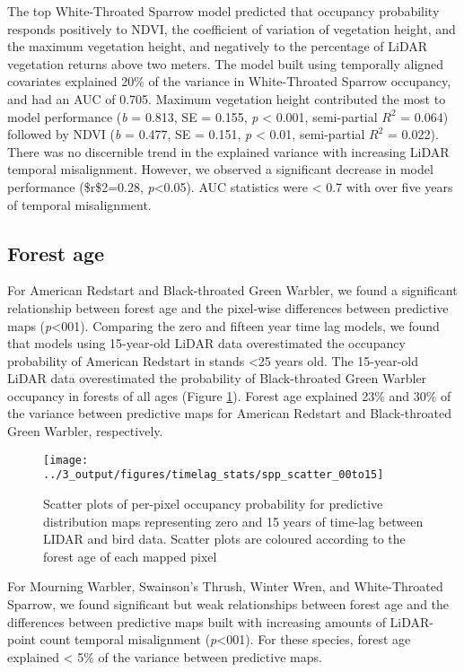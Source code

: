 \documentclass[
  12pt,
]{article}
\begin{document}
The top White-Throated Sparrow model predicted that occupancy probability responds positively to NDVI, the coefficient of variation of vegetation height, and the maximum vegetation height, and negatively to the percentage of LiDAR vegetation returns above two meters. The model built using temporally aligned covariates explained 20\% of the variance in White-Throated Sparrow occupancy, and had an AUC of 0.705. Maximum vegetation height contributed the most to model performance (\emph{b} = 0.813, SE = 0.155, \emph{p} \textless{} 0.001, semi-partial \(R^2\) = 0.064) followed by NDVI (\emph{b} = 0.477, SE = 0.151, \emph{p} \textless{} 0.01, semi-partial \(R^2\) = 0.022). There was no discernible trend in the explained variance with increasing LiDAR temporal misalignment. However, we observed a significant decrease in model performance (\$r\$2=0.28, \emph{p}\textless0.05). AUC statistics were \textless{} 0.7 with over five years of temporal misalignment.

\hypertarget{forest-age}{%
\subsection{Forest age}\label{forest-age}}

For American Redstart and Black-throated Green Warbler, we found a significant relationship between forest age and the pixel-wise differences between predictive maps (\emph{p}\textless001). Comparing the zero and fifteen year time lag models, we found that models using 15-year-old LiDAR data overestimated the occupancy probability of American Redstart in stands \textless25 years old. The 15-year-old LiDAR data overestimated the probability of Black-throated Green Warbler occupancy in forests of all ages (Figure \ref{fig:scatter}). Forest age explained 23\% and 30\% of the variance between predictive maps for American Redstart and Black-throated Green Warbler, respectively.

\begin{figure}[!ht]
\texttt{[image: ../3\_output/figures/timelag\_stats/spp\_scatter\_00to15]} \caption{Scatter plots of per-pixel occupancy probability for predictive distribution maps representing zero and 15 years of time-lag between LIDAR and bird data. Scatter plots are coloured according to the forest age of each mapped pixel}\label{fig:scatter}
\end{figure}

For Mourning Warbler, Swainson's Thrush, Winter Wren, and White-Throated Sparrow, we found significant but weak relationships between forest age and the differences between predictive maps built with increasing amounts of LiDAR-point count temporal misalignment (\emph{p}\textless001). For these species, forest age explained \textless{} 5\% of the variance between predictive maps.
\end{document}
